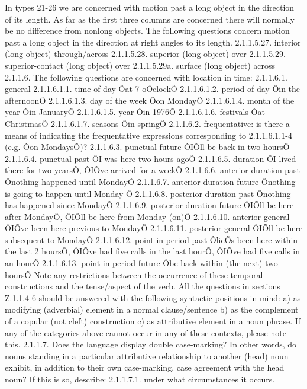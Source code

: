 In types 21-26 we are concerned with motion past a long object in the direction of its length. As far as the first three columns are concerned there will normally be no difference from nonlong objects. The following questions concern motion past a long object in the direction at right angles to its length.
2.1.1.5.27. interior (long object) through/across
2.1.1.5.28. superior (long object) over
2.1.1.5.29. superior-contact (long object) over
2.1.1.5.29a. surface (long object) across
2.1.1.6. The following questions are concerned with location in time:
2.1.1.6.1. general
2.1.1.6.1.1. time of day Ôat 7 oÕclockÕ
2.1.1.6.1.2. period of day Ôin the afternoonÕ
2.1.1.6.1.3. day of the week Ôon MondayÕ
2.1.1.6.1.4. month of the year Ôin JanuaryÕ
2.1.1.6.1.5. year Ôin 1976Õ
2.1.1.6.1.6. festivals Ôat ChristmasÕ
2.1.1.6.1.7. seasons Ôin springÕ
2.1.1.6.2. frequentative: is there a means of indicating the frequentative expressions corresponding to 2.1.1.6.1.1-4 (e.g. Ôon MondaysÕ)?
2.1.1.6.3. punctual-future ÔIÕll be back in two hoursÕ
2.1.1.6.4. punctual-past ÔI was here two hours agoÕ
2.1.1.6.5. duration ÔI lived there for two yearsÕ, ÔIÕve arrived for a weekÕ
2.1.1.6.6. anterior-duration-past Ônothing happened until MondayÕ
2.1.1.6.7. anterior-duration-future Ônothing is going to happen until Monday Ô
2.1.1.6.8. posterior-duration-past Ônothing has happened since MondayÕ
2.1.1.6.9. posterior-duration-future ÔIÕll be here after MondayÕ, ÔIÕll be here from Monday (on)Õ
2.1.1.6.10. anterior-general ÔIÕve been here previous to MondayÕ
2.1.1.6.11. posterior-general ÔIÕll be here subsequent to MondayÕ
2.1.1.6.12. point in period-past ÔlieÕs been here within the last 2 hoursÕ, ÔIÕve had five calls in the last hourÕ, ÔIÕve had five calls in an hourÕ
2.1.1.6.13. point in period-future Ôbe back within (the next) two hoursÕ
Note any restrictions between the occurrence of these temporal constructions and the tense/aspect of the verb.
All the questions in sections Z.1.1.4-6 should be answered with the following syntactic positions in mind:
a) as modifying (adverbial) element in a normal clause/sentence
b) as the complement of a copular (not cleft) construction c) as attributive element in a noun phrase.
If any of the categories above cannot occur in any of these contexts, please note this.
2.1.1.7. Does the language display double case-marking?
In other words, do nouns standing in a particular attributive relationship to another (head) noun exhibit, in addition to their own case-marking, case agreement with the head noun? If this is so, describe:
2.1.1.7.1. under what circumstances it occurs.
